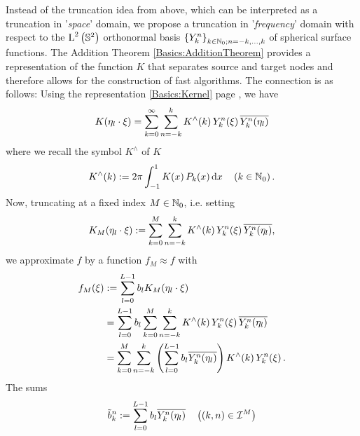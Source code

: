 Instead of the truncation idea from above, which can be interpreted as a truncation in 
'\emph{space}' domain, we propose a truncation in '\emph{frequency}' domain with respect 
to the $\text{\rm{L}}^{2}\left(\mathbb{S}^2\right)$ orthonormal basis $\left\{Y_{k}^n\right\rbrace_{k\in\mathbb{N}_{0}; n = -k,\ldots,k}$ 
of spherical surface functions. The Addition Theorem \ref{Basics:AdditionTheorem} provides a 
representation of the function $K$ that separates source and target nodes and 
therefore allows for the construction of fast algorithms. The connection is as 
follows: Using the representation \eqref{Basics:Kernel} page \pageref{Basics:Kernel}, we have
\begin{equation}
  \label{Applications:KSeries}
  K{\hspace{-0.4ex}}\left(\mathbf{\eta}_{l} \cdot \mathbf{\xi}\right) = \sum_{k=0}^{\infty} \sum_{n=-k}^k 
  K^{\wedge}{\hspace{-0.4ex}}\left(k\right)   Y_{k}^n{\hspace{-0.4ex}}\left(\mathbf{\xi}\right) \overline{Y_{k}^n{\hspace{-0.4ex}}\left(\mathbf{\eta}_{l}\right)}
\end{equation}
where we recall the symbol $K^{\wedge}$ of $K$
\[
  K^{\wedge}{\hspace{-0.4ex}}\left(k\right) := 2 \pi \int_{-1}^{1} K{\hspace{-0.4ex}}\left(x\right) P_{k}{\hspace{-0.4ex}}\left(x\right) \text{\rm{d}} x 
  \quad \left(k \in \mathbb{N}_{0}\right).
\]
Now, truncating at a fixed index $M \in \mathbb{N}_{0}$, i.e. setting
\begin{equation}
  \label{Applications:TruncatedSeries}
  K_{M}{\hspace{-0.4ex}}\left(\mathbf{\eta}_{l} \cdot \mathbf{\xi}\right) := 
  \sum_{k=0}^{M} \sum_{n=-k}^k K^{\wedge}{\hspace{-0.4ex}}\left(k\right) Y_{k}^n{\hspace{-0.4ex}}\left(\mathbf{\xi}\right) \overline{Y_{k}^n{\hspace{-0.4ex}}\left(\mathbf{\eta}_{l}\right)},
\end{equation}
we approximate $f$ by a function $f_{M} \approx f$ with
\begin{equation}
  \nonumber
  \begin{split}
    f_{M}{\hspace{-0.4ex}}\left(\xi\right) & := \sum_{l = 0}^{L-1} b_{l} K_{M}{\hspace{-0.4ex}}\left(\mathbf{\eta}_{l} \cdot \mathbf{\xi}\right) \\
                 &       = \sum_{l = 0}^{L-1} b_{l} \sum_{k=0}^{M} \sum_{n=-k}^k K^{\wedge}{\hspace{-0.4ex}}\left(k\right)
                           Y_{k}^n{\hspace{-0.4ex}}\left(\mathbf{\xi}\right) \overline{Y_{k}^n{\hspace{-0.4ex}}\left(\mathbf{\eta}_{l}\right)} \\
                 &       = \sum_{k=0}^{M} \sum_{n=-k}^k \left(\sum_{l = 0}^{L-1} b_{l}
                           \overline{Y_{k}^n{\hspace{-0.4ex}}\left(\mathbf{\eta}_{l}\right)}\right) K^{\wedge}{\hspace{-0.4ex}}\left(k\right) Y_{k}^n{\hspace{-0.4ex}}\left(\mathbf{\xi}\right).
  \end{split}                           
\end{equation}
The sums
\begin{equation}
\label{Applications:AdjointNDSFT}
  \tilde{b}_{k}^n := \sum_{l = 0}^{L-1} b_{l} \overline{Y_{k}^n{\hspace{-0.4ex}}\left(\mathbf{\eta}_{l}\right)} \quad \left((k,n) \in \mathcal{I}^M\right)
\end{equation}
